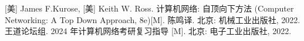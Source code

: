 \documentclass[10pt,UTF8]{ctexbook} %
\begin{document}


\onecolumn
\begin{thebibliography}{1}
    [美] James F.Kurose, [美] Keith W. Ross. 计算机网络: 自顶向下方法
    (Computer Networking: A Top Down Approach, 8e)[M]. 
    陈鸣译. 北京: 机械工业出版社, 2022.
    王道论坛组. 2024 年计算机网络考研复习指导 [M]. 北京: 电子工业出版社, 2022.
\end{thebibliography}


\end{document}

